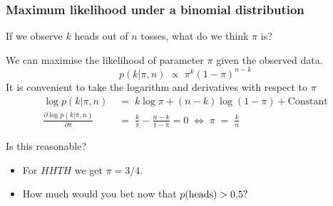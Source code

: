 \begin{frame}
\frametitle{Maximum likelihood under a binomial distribution}

If we observe $k$ heads out of $n$ tosses, what do we think $\pi$ is?

We can maximise the likelihood of parameter $\pi$ given the observed data.
\[
p(k|\pi,n)\;\propto\;\pi^k(1-\pi)^{n-k}
\]
It is convenient to take the logarithm and derivatives with respect to $\pi$
\begin{align*}
\log p(k|\pi,n)\;&=\;k\log\pi + (n-k)\log(1-\pi) + \mathrm{Constant}\\
\frac{\partial \log p(k|\pi,n)}{\partial \pi}\;&=\; \frac{k}{\pi} - \frac{n-k}{1-\pi}
=0\;\iff\;\boxed{\pi\;=\;\frac{k}{n}}
\end{align*}

Is this reasonable? 
\begin{itemize}
\item For $HHTH$ we get $\pi=3/4$. 
\item How much would you bet now that $p({\rm heads})>0.5?$\\
\hfill{}\\
\hfill{}
\end{itemize}

\end{frame}


